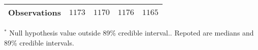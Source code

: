 \begin{table}[h]
\begin{center}
\begin{threeparttable}
\begin{tabular}{l c c c c}
\hline
Observations                                           & $1173$           & $1170$           & $1176$            & $1165$           \\
\hline
\end{tabular}
\begin{tablenotes}[flushleft]
\scriptsize{$^*$ Null hypothesis value outside 89\% credible interval.. Repoted are medians and 89\% credible intervals.}
\end{tablenotes}
\end{threeparttable}
\label{table:ol-polint-ru-pol-1223}
\end{center}
\end{table}
